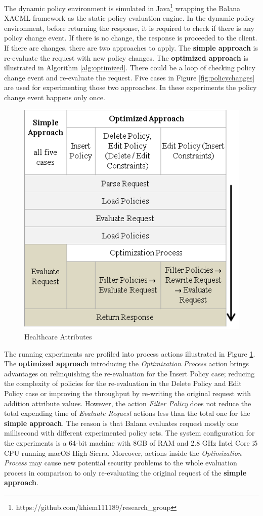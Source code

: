 The dynamic policy environment is simulated in Java\footnote{https://github.com/khiem111189/research\_group} wrapping the Balana XACML framework as the static policy evaluation engine.
In the dynamic policy environment, before returning the response, it is required to check if there is any policy change event.
If there is no change, the response is proceeded to the client.
If there are changes, there are two approaches to apply.
The \textbf{simple approach} is re-evaluate the request with new policy changes.
The \textbf{optimized approach} is illustrated in Algorithm \ref{alg:optimized}.
There could be a loop of checking policy change event and re-evaluate the request.
Five cases in Figure \ref{fig:policychanges} are used for experimenting those two approaches.
In these experiments the policy change event happens only once.

\begin{figure}[ht!]
  \centering
  \includegraphics[scale=0.8]{fig/actions.png}
  \caption{Healthcare Attributes}
  \label{fig:actions}
\end{figure}

The running experiments are profiled into process actions illustrated in Figure \ref{fig:actions}.
The \textbf{optimized approach} introducing the \textit{Optimization Process} action brings advantages on relinquishing the re-evaluation for the Insert Policy case; reducing the complexity of policies for the re-evaluation in the Delete Policy and Edit Policy case or improving the throughput by re-writing the original request with addition attribute values.
However, the action \textit{Filter Policy} does not reduce the total expending time of \textit{Evaluate Request} actions less than the total one for the \textbf{simple approach}.
The reason is that Balana evaluates request mostly one millisecond with different experimented policy sets.
The system configuration for the experiments is a 64-bit machine with 8GB of RAM and 2.8 GHz Intel Core i5 CPU running macOS High Sierra.
Moreover, actions inside the \textit{Optimization Process} may cause new potential security problems to the whole evaluation process in comparison to only re-evaluating the original request of the \textbf{simple approach}.

